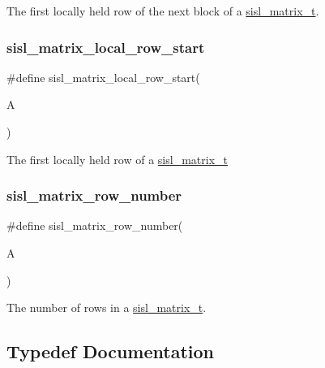 The first locally held row of the next block of a \mbox{\hyperlink{group__matrix_gad147923587b355644defb9bfbf981740}{sisl\+\_\+matrix\+\_\+t}}. \mbox{\label{group__matrix_ga339f27e10f6f6a964c752046b9853d13}} 
\subsubsection{\texorpdfstring{sisl\+\_\+matrix\+\_\+local\+\_\+row\+\_\+start}{sisl\_matrix\_local\_row\_start}}
{\footnotesize\ttfamily \#define sisl\+\_\+matrix\+\_\+local\+\_\+row\+\_\+start(\begin{DoxyParamCaption}\item[{}]{A }\end{DoxyParamCaption})}

The first locally held row of a \mbox{\hyperlink{group__matrix_gad147923587b355644defb9bfbf981740}{sisl\+\_\+matrix\+\_\+t}} \mbox{\label{group__matrix_ga1782032b02988b281e8362215abe2ecd}} 
\subsubsection{\texorpdfstring{sisl\+\_\+matrix\+\_\+row\+\_\+number}{sisl\_matrix\_row\_number}}
{\footnotesize\ttfamily \#define sisl\+\_\+matrix\+\_\+row\+\_\+number(\begin{DoxyParamCaption}\item[{}]{A }\end{DoxyParamCaption})}

The number of rows in a \mbox{\hyperlink{group__matrix_gad147923587b355644defb9bfbf981740}{sisl\+\_\+matrix\+\_\+t}}. 

\subsection{Typedef Documentation}
\mbox{\label{group__matrix_gad147923587b355644defb9bfbf981740}} 

